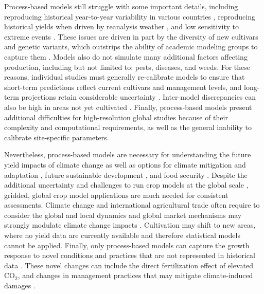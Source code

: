 \documentclass[gmd, manuscript]{copernicus} %
\begin{document}
Process-based models still struggle with some important details, including reproducing historical year-to-year variability in various countries \citep[e.g.][]{muller_global_2017}, reproducing historical yields when driven by reanalysis weather \citep[e.g.][]{Glotter14}, and low sensitivity to extreme events \citep[e.g.][]{Glotter15, Jag2018, schewe2019}. 
These issues are driven in part by the diversity of new cultivars and genetic variants, which outstrips the ability of academic modeling groups to capture them \citep[e.g.][]{JONES2017b}. 
Models also do not simulate many additional factors affecting production, including but not limited to: pests, diseases, and weeds. 
For these reasons, individual studies must generally re-calibrate models to ensure that short-term predictions reflect current cultivars and management levels, and long-term projections retain considerable uncertainty \citep{WOLF2002217, JAGTAP200273, Iizumi2010, ANGULO201332, Asseng2013, Asseng2015}. 
Inter-model discrepancies can also be high in areas not yet cultivated \citep[e.g.][]{Challinor2014, WHITE2011357}. 
Finally, process-based models present additional difficulties for high-resolution global studies because of their complexity and computational requirements, as well as the general inability to calibrate site-specific parameters. 

Nevertheless, process-based models are necessary for understanding the future yield impacts of climate change as well as options for climate mitigation \citep{muller2015} and adaptation \citep{challinor2018improving}, future sustainable development \citep{humpenoder2018large}, and food security \citep{wheeler2013climate}. 
Despite the additional uncertainty and challenges to run crop models at the global scale \citep{muller_global_2017}, gridded, global crop model applications are much needed for consistent assessments.
Climate change and international agricultural trade often require to consider the global and local dynamics \citep{rosenzweig2018,ruane2018} and global market mechanisms may strongly modulate climate change impacts \citep{Stevanovic2016,hasegawa2018risk}.
Cultivation may shift to new areas, where no yield data are currently available and therefore statistical models cannot be applied. 
Finally, only process-based models can capture the growth response to novel conditions and practices that are not represented in historical data \citep[e.g.][]{pugh_climate_2016, Roberts2017}. 
These novel changes can include the direct fertilization effect of elevated CO$_2$, and changes in management practices that may mitigate climate-induced damages \citep[e.g.][]{minoli2019modelling}.
\end{document}
